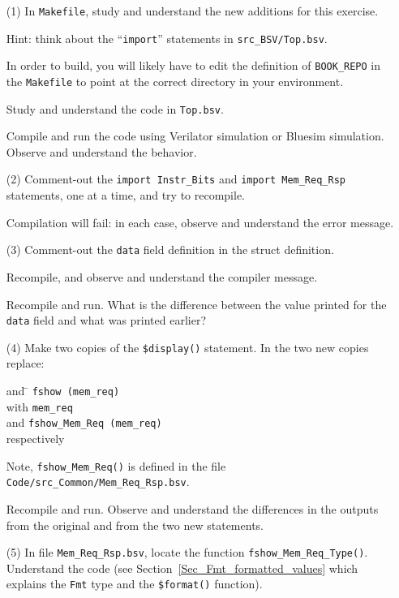 \begin{itemize}

\item[(1)] In \verb|Makefile|, study and understand the new additions
    for this exercise.

    Hint: think about the ``\verb|import|'' statements in
    \verb|src_BSV/Top.bsv|.

    In order to build, you will likely have to edit the definition of
    \verb|BOOK_REPO| in the \verb|Makefile| to point at the correct
    directory in your environment.

    Study and understand the code in \verb|Top.bsv|.

    Compile and run the code using Verilator simulation or Bluesim
    simulation.  Observe and understand the behavior.

\item[(2)] Comment-out the \verb|import Instr_Bits| and \verb|import Mem_Req_Rsp|
    statements, one at a time, and try to recompile.

    Compilation will fail: in each case, observe and understand the error message.

\item[(3)] Comment-out the \verb|data| field definition in the struct definition.

    Recompile, and observe and understand the compiler message.

    Recompile and run.  What is the difference between the value
    printed for the \verb|data| field and what was printed earlier?

\item[(4)] Make two copies of the \verb|$display()| statement. In the
    two new copies replace:
    \begin{tabbing}
    \hm and \hm \= \kill
                \> {\tt fshow (mem\_req)} \\
    \hm with    \> {\tt mem\_req} \\
    \hm and     \> {\tt fshow\_Mem\_Req (mem\_req)} \\
    \hm respectively
    \end{tabbing}

    Note, \verb|fshow_Mem_Req()| is defined in the file
    {\tt Code/src\_Common/Mem\_Req\_Rsp.bsv}.

    Recompile and run. Observe and understand the differences in the
    outputs from the original and from the two new statements.

\item[(5)] In file \verb|Mem_Req_Rsp.bsv|, locate the function
    \verb|fshow_Mem_Req_Type()|.  Understand the code (see
    Section~\ref{Sec_Fmt_formatted_values} which explains the
    \verb|Fmt| type and the \verb|$format()| function).


\end{itemize}
